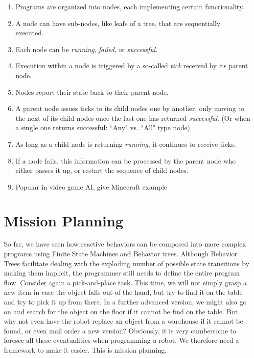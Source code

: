 \begin{enumerate}
\item Programs are organized into nodes, each implementing certain functionality.
\item A node can have sub-nodes, like leafs of a tree, that are sequentially executed.
\item Each node can be \emph{running}, \emph{failed}, or \emph{successful}.
\item Execution within a node is triggered by a so-called \emph{tick} received by its parent node.
\item Nodes report their state back to their parent node.
\item A parent node issues ticks to its child nodes one by another, only moving to the next of its child nodes once the last one has returned \emph{successful}. (Or when a single one returns successful: ``Any" vs. ``All" type node)
\item As long as a child node is returning \emph{running}, it continues to receive ticks.
\item If a node fails, this information can be processed by the parent node who either passes it up, or restart the sequence of child nodes.
\item Popular in video game AI, give Minecraft example
\end{enumerate}

\section{Mission Planning}\label{sec:strips}
So far, we have seen how reactive behaviors can be composed into more complex programs using Finite State Machines and Behavior trees. Although Behavior Trees facilitate dealing with the exploding number of possible state transitions by making them implicit, the programmer still needs to define the entire program flow. Consider again a pick-and-place task. This time, we will not simply grasp a new item in case the object falls out of the hand, but try to find it on the table and try to pick it up from there. In a further advanced version, we might also go on and search for the object on the floor if it cannot be find on the table. But why not even have the robot replace an object from a warehouse if it cannot be found, or even mail order a new version? Obviously, it is very cumbersome to foresee all these eventualities when programming a robot. We therefore need a framework to make it easier. This is mission planning.


